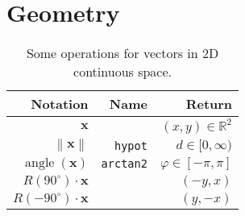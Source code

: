 \section{Geometry}
\begin{table}[H]
\begin{tabularx}{1.0\linewidth}{ R R R }
Notation & Name & Return \\
\hline
\hline
$ \mathbf{x} $ & & $ (x, y) \in \mathbb{R}^{2} $ \\
$ \left\| \mathbf{x} \right\| $      & \texttt{hypot} & $ d \in [0, \infty) $ \\
$ \operatorname{angle}(\mathbf{x}) $ & \texttt{arctan2} & $ \varphi \in [-\pi, \pi] $ \\
$ R(90^{\circ}) \cdot \mathbf{x} $   &  & $ (-y, x) $ \\
$ R(-90^{\circ}) \cdot \mathbf{x} $  &  & $ (y, -x) $ \\
\end{tabularx}
\caption{Some operations for vectors in 2D continuous space.}
\end{table}